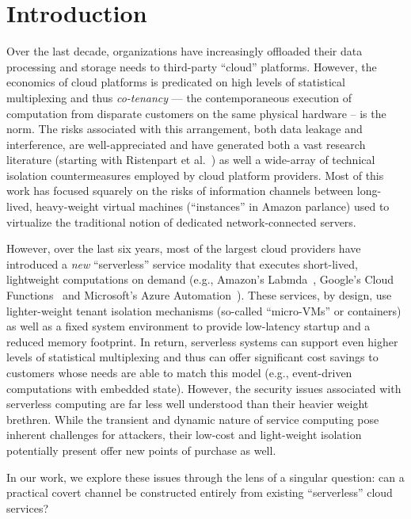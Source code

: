 \section{Introduction}
\label{sec:intro}

Over the last decade, organizations have increasingly offloaded their
data processing and storage needs to third-party ``cloud'' platforms.
However, the economics of cloud platforms is predicated on high levels
of statistical multiplexing and thus \emph{co-tenancy} --- the
contemporaneous execution of computation from disparate customers on
the same physical hardware -- is the norm.  The risks associated with
this arrangement, both data leakage and interference, are
well-appreciated and have generated both a vast research literature
(starting with Ristenpart et al.~\cite{ristenpartccs2009}) as well a
wide-array of technical isolation countermeasures employed by cloud
platform providers. Most of this work has focused squarely on the risks
of information channels between long-lived, heavy-weight virtual
machines (``instances'' in Amazon parlance) used to virtualize the
traditional notion of dedicated network-connected servers.

However, over the last six years, most of the largest cloud providers have
introduced a \emph{new} ``serverless'' service modality that executes
short-lived, lightweight computations on demand (e.g., Amazon's
Labmda~\cite{awslambda}, Google's Cloud Functions~\cite{gcpfunctions} and
Microsoft's Azure Automation~\cite{azueautomation}).  These services, by design,
use lighter-weight tenant isolation mechanisms (so-called ``micro-VMs'' or
containers) as well as a fixed system environment to provide low-latency startup
and a reduced memory footprint.  In return, serverless systems can support even
higher levels of statistical multiplexing and thus can offer significant cost
savings to customers whose needs are able to match this model (e.g.,
event-driven computations with embedded state).  However, the security issues
associated with serverless computing are far less well understood than their
heavier weight brethren.  While the transient and dynamic nature of service
computing pose inherent challenges for attackers, their low-cost and
light-weight isolation potentially present offer new points of purchase as well.

In our work, we explore these issues through the lens of a singular question:
can a practical covert channel be constructed entirely from existing
``serverless'' cloud services?

